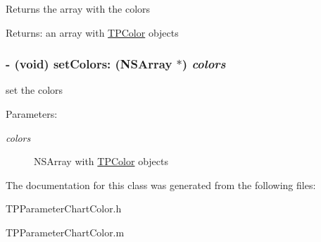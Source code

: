 Returns the array with the colors \begin{Desc}
\item[Returns:]an array with \hyperlink{interface_t_p_color}{TPColor} objects \end{Desc}
\hypertarget{interface_t_p_parameter_chart_color_21f439b808b2f6a9495c337e740db7b8}{
\subsubsection[{setColors:}]{\setlength{\rightskip}{0pt plus 5cm}- (void) setColors: (NSArray $\ast$) {\em colors}}}
\label{interface_t_p_parameter_chart_color_21f439b808b2f6a9495c337e740db7b8}


set the colors \begin{Desc}
\item[Parameters:]
\begin{description}
\item[{\em colors}]NSArray with \hyperlink{interface_t_p_color}{TPColor} objects \end{description}
\end{Desc}


The documentation for this class was generated from the following files:\begin{CompactItemize}
\item 
TPParameterChartColor.h\item 
TPParameterChartColor.m\end{CompactItemize}

